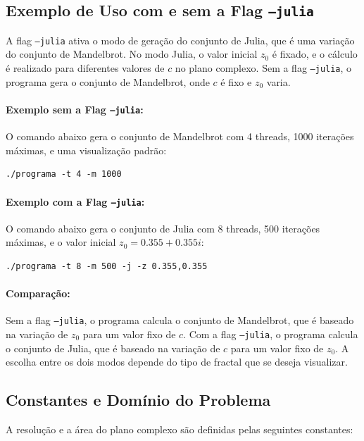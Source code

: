 \subsection{Exemplo de Uso com e sem a Flag \texttt{--julia}}

A flag \texttt{--julia} ativa o modo de geração do conjunto de Julia, que é uma variação do conjunto de Mandelbrot. No modo Julia, o valor inicial \( z_0 \) é fixado, e o cálculo é realizado para diferentes valores de \( c \) no plano complexo. Sem a flag \texttt{--julia}, o programa gera o conjunto de Mandelbrot, onde \( c \) é fixo e \( z_0 \) varia.

\paragraph{Exemplo sem a Flag \texttt{--julia}:}
O comando abaixo gera o conjunto de Mandelbrot com 4 threads, 1000 iterações máximas, e uma visualização padrão:
\begin{lstlisting}
./programa -t 4 -m 1000
\end{lstlisting}

\paragraph{Exemplo com a Flag \texttt{--julia}:}
O comando abaixo gera o conjunto de Julia com 8 threads, 500 iterações máximas, e o valor inicial \( z_0 = 0.355 + 0.355i \):
\begin{lstlisting}
./programa -t 8 -m 500 -j -z 0.355,0.355
\end{lstlisting}

\paragraph{Comparação:}
Sem a flag \texttt{--julia}, o programa calcula o conjunto de Mandelbrot, que é baseado na variação de \( z_0 \) para um valor fixo de \( c \). Com a flag \texttt{--julia}, o programa calcula o conjunto de Julia, que é baseado na variação de \( c \) para um valor fixo de \( z_0 \). A escolha entre os dois modos depende do tipo de fractal que se deseja visualizar.


\subsection{Constantes e Domínio do Problema}

A resolução e a área do plano complexo são definidas pelas seguintes constantes:

